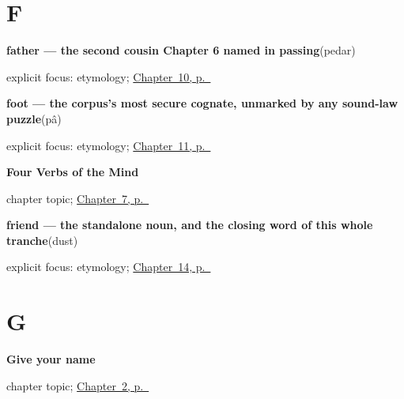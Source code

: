 \section*{F}

\noindent\begin{minipage}[t]{\linewidth}
\raggedright
\textbf{father — the second cousin Chapter 6 named in passing}\enspace\emph{}\enspace(pedar)\par
\footnotesize explicit focus: etymology; \hyperref[ch:fa-family]{Chapter~10, p.~\pageref*{ch:fa-family}}
\end{minipage}\par\smallskip

\noindent\begin{minipage}[t]{\linewidth}
\raggedright
\textbf{foot — the corpus's most secure cognate, unmarked by any sound-law puzzle}\enspace\emph{}\enspace(pâ)\par
\footnotesize explicit focus: etymology; \hyperref[ch:fa-body]{Chapter~11, p.~\pageref*{ch:fa-body}}
\end{minipage}\par\smallskip

\noindent\begin{minipage}[t]{\linewidth}
\raggedright
\textbf{Four Verbs of the Mind}\par
\footnotesize chapter topic; \hyperref[ch:fa-mind-verbs]{Chapter~7, p.~\pageref*{ch:fa-mind-verbs}}
\end{minipage}\par\smallskip

\noindent\begin{minipage}[t]{\linewidth}
\raggedright
\textbf{friend — the standalone noun, and the closing word of this whole tranche}\enspace\emph{}\enspace(dust)\par
\footnotesize explicit focus: etymology; \hyperref[ch:fa-people-words]{Chapter~14, p.~\pageref*{ch:fa-people-words}}
\end{minipage}\par\smallskip

\section*{G}

\noindent\begin{minipage}[t]{\linewidth}
\raggedright
\textbf{Give your name}\par
\footnotesize chapter topic; \hyperref[ch:persian-name]{Chapter~2, p.~\pageref*{ch:persian-name}}
\end{minipage}\par\smallskip

